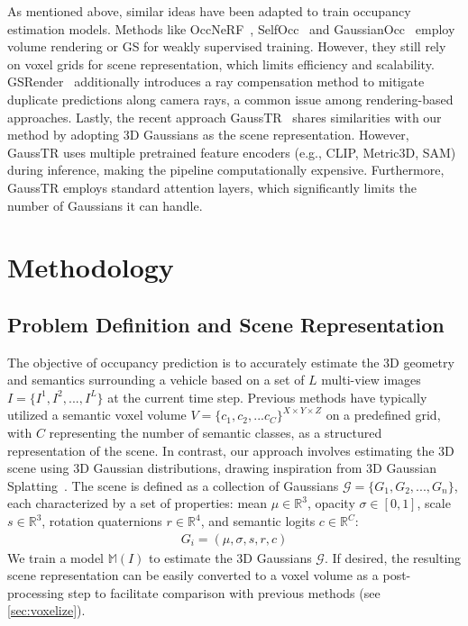 \documentclass[10pt,twocolumn,letterpaper]{article}
\begin{document}
As mentioned above, similar ideas have been adapted to train occupancy estimation models.
Methods like OccNeRF~\cite{zhang2023occnerf}, SelfOcc~\cite{huang2023selfocc} and GaussianOcc~\cite{gan2024gaussianocc} employ volume rendering or GS for weakly supervised training.
However, they still rely on voxel grids for scene representation, which limits efficiency and scalability.
GSRender~\cite{sun2024gsrender} additionally introduces a ray compensation method to mitigate duplicate predictions along camera rays, a common issue among rendering-based approaches.
Lastly, the recent approach GaussTR~\cite{jiang2024gausstr} shares similarities with our method by adopting 3D Gaussians as the scene representation.
However, GaussTR uses multiple pretrained feature encoders (e.g., CLIP, Metric3D, SAM) during inference, making the pipeline computationally expensive.
Furthermore, GaussTR employs standard attention layers, which significantly limits the number of Gaussians it can handle. 

\section{Methodology}\label{sec:methodology}
\subsection{Problem Definition and Scene Representation}\label{sec:problem_definition}
The objective of occupancy prediction is to accurately estimate the 3D geometry and semantics surrounding a vehicle based on a set of $L$ multi-view images $I = \{I^1, I^2, ..., I^L\}$ at the current time step.
Previous methods have typically utilized a semantic voxel volume $V=\{c_1, c_2, ... c_{C}\}^{X \times Y \times Z}$ on a predefined grid, with $C$ representing the number of semantic classes, as a structured representation of the scene.
In contrast, our approach involves estimating the 3D scene using 3D Gaussian distributions, drawing inspiration from 3D Gaussian Splatting~\cite{kerbl20233d}.
The scene is defined as a collection of Gaussians $\mathcal{G} = \{G_1, G_2, ..., G_n\}$, each characterized by a set of properties: mean $\mu \in \mathbb{R}^3$, opacity $\sigma \in [0,1]$, scale $s \in \mathbb{R}^{3}$, rotation quaternions $r \in \mathbb{R}^4$, and semantic logits $c \in \mathbb{R}^{C}$:
\begin{align}
G_i = (\mu, \sigma, s, r, c)
\label{eq:scene_definition}
\end{align}
We train a model $\mathbb{M}(I)$ to estimate the 3D Gaussians $\mathcal{G}$.
If desired, the resulting scene representation can be easily converted to a voxel volume as a post-processing step to facilitate comparison with previous methods (see \cref{sec:voxelize}).
\end{document}
